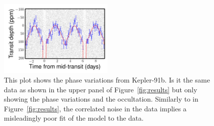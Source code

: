 \documentclass[apjl]{emulateapj}
\begin{document}
\begin{figure}
\includegraphics[width=0.50\textwidth]{koi2133_zoom.png}
\caption{This plot shows the phase variations from Kepler-91b. Is it the same data as shown in the upper panel of Figure~\ref{fig:results} but only showing the phase variations and the occultation. Similarly to in Figure~\ref{fig:results}, the correlated noise in the data implies a misleadingly poor fit of the model to the data.}
\label{fig:results_zoom}
\end{figure}
\end{document}
